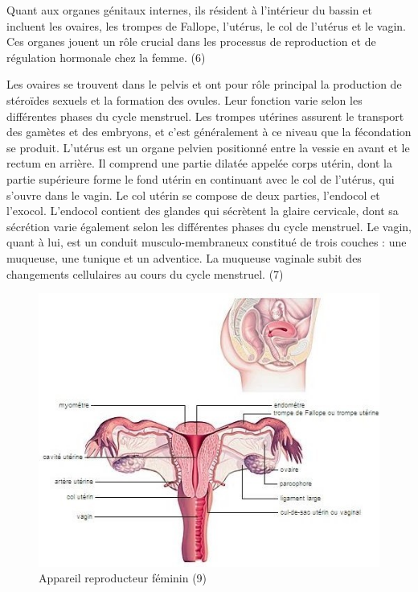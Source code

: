 \vspace*{1em}


\noindent Quant aux organes génitaux internes, ils résident à l'intérieur du bassin et incluent les ovaires, les trompes de Fallope, l'utérus, le col de l'utérus et le vagin. Ces organes jouent un rôle crucial dans les processus de reproduction et de régulation hormonale chez la femme. (6) \vspace*{1em}

\noindent Les ovaires se trouvent dans le pelvis et ont pour rôle principal la production de stéroïdes sexuels et la formation des ovules. Leur fonction varie selon les différentes phases du cycle menstruel. Les trompes utérines assurent le transport des gamètes et des embryons, et c'est généralement à ce niveau que la fécondation se produit. L'utérus est un organe pelvien positionné entre la vessie en avant et le rectum en arrière. Il comprend une partie dilatée appelée corps utérin, dont la partie supérieure forme le fond utérin en continuant avec le col de l'utérus, qui s'ouvre dans le vagin. Le col utérin se compose de deux parties, l'endocol et l'exocol. L'endocol contient des glandes qui sécrètent la glaire cervicale, dont sa sécrétion varie également selon les différentes phases du cycle menstruel. Le vagin, quant à lui, est un conduit musculo-membraneux constitué de trois couches : une muqueuse, une tunique et un adventice. La muqueuse vaginale subit des changements cellulaires au cours du cycle menstruel. (7) \vspace*{1em}

\begin{figure}[H]
  \centering
  \includegraphics{Images/fig_2.jpg}
  \caption{Appareil reproducteur féminin (9)}
\end{figure}


